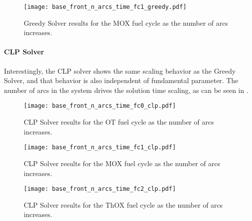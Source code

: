 \begin{figure}[h!]
  \begin{center}
    \texttt{[image: base\_front\_n\_arcs\_time\_fc1\_greedy.pdf]}
    \caption[]{
      \label{fig:base_front_n_arcs_time_fc1_greedy}
      Greedy Solver results for the MOX fuel cycle as the number of arcs
      increases.      
    }
  \end{center}
\end{figure}

\paragraph{CLP Solver}

Interestingly, the CLP solver shows the same scaling behavior as the Greedy
Solver, and that behavior is also independent of fundamental parameter. The
number of arcs in the system drives the solution time scaling, as can be seen in
.

\begin{figure}[h!]
  \begin{center}
    \texttt{[image: base\_front\_n\_arcs\_time\_fc0\_clp.pdf]}
    \caption[]{
      \label{fig:base_front_n_arcs_time_fc0_clp}
      CLP Solver results for the OT fuel cycle as the number of arcs
      increases.
      }
  \end{center}
\end{figure}

\begin{figure}[h!]
  \begin{center}
    \texttt{[image: base\_front\_n\_arcs\_time\_fc1\_clp.pdf]}
    \caption[]{
      \label{fig:base_front_n_arcs_time_fc1_clp}
      CLP Solver results for the MOX fuel cycle as the number of arcs
      increases.
      }
  \end{center}
\end{figure}

\begin{figure}[h!]
  \begin{center}
    \texttt{[image: base\_front\_n\_arcs\_time\_fc2\_clp.pdf]}
    \caption[]{
      \label{fig:base_front_n_arcs_time_fc2_clp}
      CLP Solver results for the ThOX fuel cycle as the number of arcs
      increases.
      }
  \end{center}
\end{figure}

